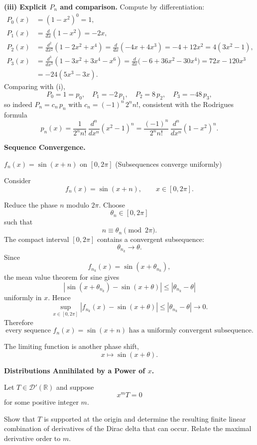 \begin{solution}
\par\smallskip\noindent\textbf{(iii) Explicit $P_n$ and comparison.}\quad
Compute by differentiation:
\[
\begin{aligned}
	P_0(x)&=(1-x^2)^{0}=1,\\
	P_1(x)&=\frac{d}{dx}(1-x^2)=-2x,\\
	P_2(x)&=\frac{d^2}{dx^2}(1-2x^2+x^4)=\frac{d}{dx}(-4x+4x^3)=-4+12x^2=4(3x^2-1),\\
	P_3(x)&=\frac{d^3}{dx^3}(1-3x^2+3x^4-x^6)=\frac{d}{dx}\big(-6+36x^2-30x^4\big)=72x-120x^3\\
	&=-24(5x^3-3x).
\end{aligned}
\]
Comparing with (i),
\[
P_0=1=p_0,\quad
P_1=-2\,p_1,\quad
P_2=8\,p_2,\quad
P_3=-48\,p_3,
\]
so indeed $P_n=c_n\,p_n$ with $c_n=(-1)^n\,2^n n!$, consistent with the Rodrigues formula
\[
p_n(x)=\frac{1}{2^n n!}\,\frac{d^n}{dx^n}(x^2-1)^n
=\frac{(-1)^n}{2^n n!}\,\frac{d^n}{dx^n}(1-x^2)^n.
\]
\end{solution}

\begin{problem}[CP-II-0058]
\label{prob:cp-ii-0058}
\textbf{Sequence Convergence.}

\hspace*{1.5em}$f_n(x)=\sin(x+n)$ on $[0,2\pi]$ (Subsequences converge uniformly)
\end{problem}

\begin{solution}
Consider
\[
f_n(x)=\sin(x+n),
\qquad
x\in[0,2\pi].
\]

Reduce the phase \(n\) modulo \(2\pi\). Choose
\[
\theta_n\in[0,2\pi]
\]
such that
\[
n\equiv\theta_n\pmod{2\pi}.
\]
The compact interval \([0,2\pi]\) contains a convergent subsequence:
\[
\theta_{n_k}\to\theta.
\]
Since
\[
f_{n_k}(x)=\sin(x+\theta_{n_k}),
\]
the mean value theorem for sine gives
\[
|\sin(x+\theta_{n_k})-\sin(x+\theta)|
\le
|\theta_{n_k}-\theta|
\]
uniformly in \(x\). Hence
\[
\sup_{x\in[0,2\pi]}
|f_{n_k}(x)-\sin(x+\theta)|
\le
|\theta_{n_k}-\theta|
\longrightarrow0.
\]
Therefore
\[
\boxed{
\text{every sequence }f_n(x)=\sin(x+n)
\text{ has a uniformly convergent subsequence}.
}
\]

The limiting function is another phase shift,
\[
x\longmapsto\sin(x+\theta).
\]
\end{solution}


\begin{problem}[CP-II-0060]
\label{prob:cp-ii-0060}
\textbf{Distributions Annihilated by a Power of \(x\).}

\hspace*{1.5em}Let \(T\in\mathcal D'(\mathbb R)\) and suppose
\[
x^mT=0
\]
for some positive integer \(m\).

Show that \(T\) is supported at the origin and determine the resulting finite
linear combination of derivatives of the Dirac delta that can occur. Relate
the maximal derivative order to \(m\).
\end{problem}

